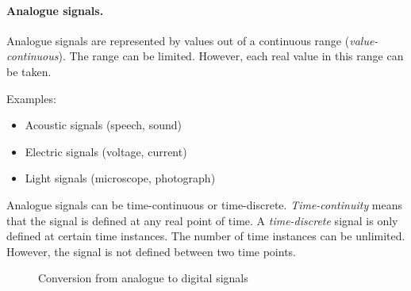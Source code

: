 \paragraph{Analogue signals.}

Analogue signals are represented by values out of a continuous range (\emph{value-continuous}). The range can be limited. However, each real value in this range can be taken.

Examples:
\begin{itemize}
	\item Acoustic signals (speech, sound)
	\item Electric signals (voltage, current)
	\item Light signals (microscope, photograph)
\end{itemize}

Analogue signals can be time-continuous or time-discrete. \emph{Time-continuity} means that the signal is defined at any real point of time. A \emph{time-discrete} signal is only defined at certain time instances. The number of time instances can be unlimited. However, the signal is not defined between two time points.

\begin{figure}[H]
	\centering
	\begin{adjustbox}{scale=0.8}
	\end{adjustbox}
	\caption{Conversion from analogue to digital signals}
	\label{fig:ch01:signals_sampling}
\end{figure}

